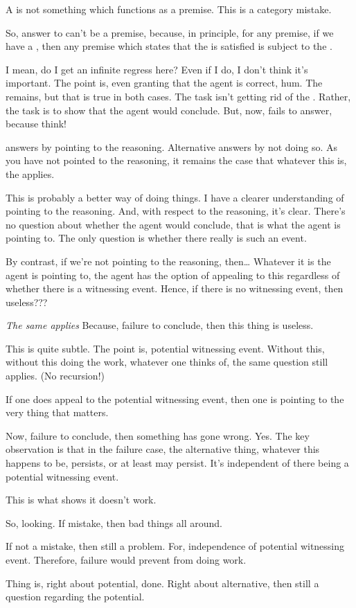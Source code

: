 \begin{note}
  A \fc{} is not something which functions as a premise.
  This is a category mistake.

  So, answer to \qzS{} can't be a premise, because, in principle, for any premise, if we have a \requ{}, then any premise which states that the \requ{} is satisfied is subject to the \requ{}.

  I mean, do I get an infinite regress here?
  Even if I do, I don't think it's important.
  The point is, even granting that the agent is correct, hum.
  The \requ{} remains, but that is true in both cases.
  The task isn't getting rid of the \requ{}.
  Rather, the task is to show that the agent would conclude.
  But, now, fails to answer, because think!

  \fc{} answers by pointing to the reasoning.
  Alternative answers by not doing so.
  As you have not pointed to the reasoning, it remains the case that whatever this is, the \requ{} applies.

  This is probably a better way of doing things.
  I have a clearer understanding of pointing to the reasoning.
  And, with respect to the reasoning, it's clear.
  There's no question about whether the agent would conclude, that is what the agent is pointing to.
  The only question is whether there really is such an event.

  By contrast, if we're not pointing to the reasoning, then\dots
  Whatever it is the agent is pointing to, the agent has the option of appealing to this regardless of whether there is a witnessing event.
  Hence, if there is no witnessing event, then useless???

  \emph{The same \requ{} applies}
  Because, failure to conclude, then this thing is useless.

  This is quite subtle.
  The point is, potential witnessing event.
  Without this, without this doing the work, whatever one thinks of, the same question still applies.
  (No recursion!)

  If one does appeal to the potential witnessing event, then one is pointing to the very thing that matters.

  Now, failure to conclude, then something has gone wrong.
  Yes.
  The key observation is that in the failure case, the alternative thing, whatever this happens to be, persists, or at least may persist.
  It's independent of there being a potential witnessing event.

  This is what shows it doesn't work.

  So, looking.
  If mistake, then bad things all around.

  If not a mistake, then still a problem.
  For, independence of potential witnessing event.
  Therefore, failure would prevent from doing work.

  Thing is, right about potential, done.
  Right about alternative, then still a question regarding the potential.
\end{note}



